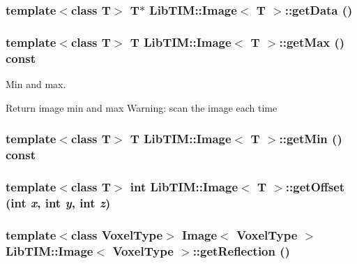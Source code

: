 \subsubsection{\setlength{\rightskip}{0pt plus 5cm}template$<$class T$>$ T$\ast$ {\bf Lib\-TIM::Image}$<$ T $>$::get\-Data ()\hspace{0.3cm}{\tt  [inline, inherited]}}\label{group__Image_ga32}


\subsubsection{\setlength{\rightskip}{0pt plus 5cm}template$<$class T$>$ T {\bf Lib\-TIM::Image}$<$ T $>$::get\-Max () const\hspace{0.3cm}{\tt  [inherited]}}\label{group__Image_ga56}


Min and max. 

Return image min and max Warning: scan the image each time 
\subsubsection{\setlength{\rightskip}{0pt plus 5cm}template$<$class T$>$ T {\bf Lib\-TIM::Image}$<$ T $>$::get\-Min () const\hspace{0.3cm}{\tt  [inherited]}}\label{group__Image_ga57}


\subsubsection{\setlength{\rightskip}{0pt plus 5cm}template$<$class T$>$ int {\bf Lib\-TIM::Image}$<$ T $>$::get\-Offset (int {\em x}, int {\em y}, int {\em z})\hspace{0.3cm}{\tt  [inline, inherited]}}\label{group__Image_ga65}


\subsubsection{\setlength{\rightskip}{0pt plus 5cm}template$<$class Voxel\-Type$>$ Image$<$ Voxel\-Type $>$ {\bf Lib\-TIM::Image}$<$ Voxel\-Type $>$::get\-Reflection ()\hspace{0.3cm}{\tt  [inherited]}}\label{group__Image_ga66}


